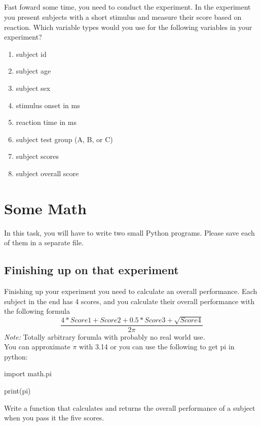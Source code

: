 \subsection{}
Fast foward some time, you need to conduct the experiment. In the experiment you
present subjects with a short stimulus and measure their score based on reaction.
Which variable types would you use for the following variables in your experiment?
\begin{enumerate}
	\item subject id
	\item subject age
	\item subject sex
	\item stimulus onset in ms
	\item reaction time in ms
	\item subject test group (A, B, or C)
	\item subject scores
	\item subject overall score
\end{enumerate}

\section{Some Math}
In this task, you will have to write two small Python programs. Please save each
of them in a separate file.

\subsection{Finishing up on that experiment}
Finishing up your experiment you need to calculate an overall performance.
Each subject in the end has 4 scores, and you calculate their overall performance
with the following formula $$ \dfrac{4*Score1 + Score2 + 0.5*Score3 + \sqrt{Score4}}{2\pi} $$
\emph{Note:} Totally arbitrary forumla with probably no real world use.\\
You can approximate \(\pi \) with 3.14 or you can use the following to get pi in python:
\begin{python}
import math.pi


print(pi)
\end{python}

Write a function that calculates and returns the overall performance of a subject when you pass it the five scores.
\cprotect{}

